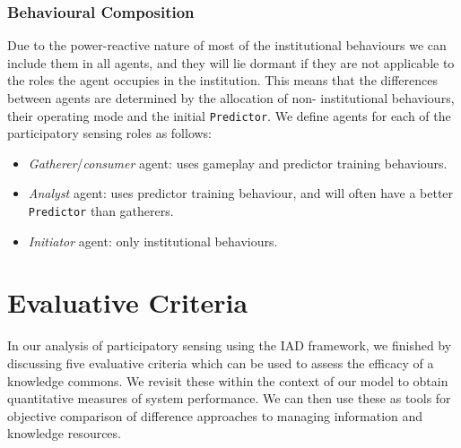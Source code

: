 
\subsubsection*{Behavioural Composition}

Due to the power-reactive nature of most of the institutional behaviours we
can include them in all agents, and they will lie dormant if they are not
applicable to the roles the agent occupies in the institution. This means that
the differences between agents are determined by the allocation of non-
institutional behaviours, their operating mode and the initial
\texttt{Predictor}. We define agents for each of the participatory sensing
roles as follows:

\begin{itemize}
\item \emph{Gatherer}/\emph{consumer} agent: uses gameplay and predictor training behaviours.
\item \emph{Analyst} agent: uses predictor training behaviour, and will often have a better \texttt{Predictor} than gatherers.
\item \emph{Initiator} agent: only institutional behaviours.
\end{itemize}

\section{Evaluative Criteria}

In our analysis of participatory sensing using the \ac{IAD} framework, we finished by
discussing five evaluative criteria which can be used to assess the efficacy
of a knowledge commons. We revisit these within the context of our model to
obtain quantitative measures of system performance. We can then use these as
tools for objective comparison of difference approaches to managing
information and knowledge resources.

